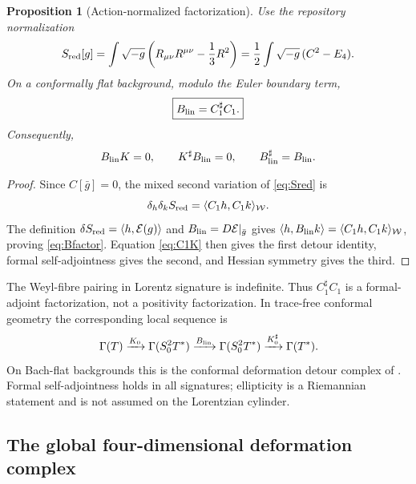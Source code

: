 \documentclass[11pt]{article}
\newtheorem{proposition}[theorem]{Proposition}
\theoremstyle{definition}
\theoremstyle{remark}
\newcommand{\W}{\mathcal W}
\newcommand{\cE}{\mathcal E}
\begin{document}
\begin{proposition}[Action-normalized factorization]\label{prop:factorization}
Use the repository normalization
\begin{equation}\label{eq:Sred}
 S_{\rm red}[g]=\int\sqrt{-g}
 \left(R_{\mu\nu}R^{\mu\nu}-\frac13R^2\right)
 =\frac12\int\sqrt{-g}\,(C^2-E_4).
\end{equation}
On a conformally flat background, modulo the Euler boundary term,
\begin{equation}\label{eq:Bfactor}
 \boxed{B_{\rm lin}=C_1^\sharp C_1.}
\end{equation}
Consequently,
\begin{equation}\label{eq:detour-identities}
 B_{\rm lin}K=0,
 \qquad
 K^\sharp B_{\rm lin}=0,
 \qquad
 B_{\rm lin}^\sharp=B_{\rm lin}.
\end{equation}
\end{proposition}

\begin{proof}
Since $C[\bar g]=0$, the mixed second variation of \eqref{eq:Sred} is
\begin{equation}
 \delta_h\delta_k S_{\rm red}
 =\langle C_1h,C_1k\rangle_{\W}.
\end{equation}
The definition
$\delta S_{\rm red}=\langle h,\cE(g)\rangle$ and
$B_{\rm lin}=D\cE|_{\bar g}$ gives
$\langle h,B_{\rm lin}k\rangle
=\langle C_1h,C_1k\rangle_{\W}$, proving
\eqref{eq:Bfactor}.  Equation \eqref{eq:C1K} then gives the first detour
identity, formal self-adjointness gives the second, and Hessian symmetry gives
the third.
\end{proof}

The Weyl-fibre pairing in Lorentz signature is indefinite.  Thus
$C_1^\sharp C_1$ is a formal-adjoint factorization, not a positivity
factorization.  In trace-free conformal geometry the corresponding local
sequence is
\begin{equation}\label{eq:detour-sequence}
 \Gamma(T)
 \xrightarrow{K_0}
 \Gamma(S^2_0T^*)
 \xrightarrow{B_{\rm lin}}
 \Gamma(S^2_0T^*)
 \xrightarrow{K_0^\sharp}
 \Gamma(T^*).
\end{equation}
On Bach-flat backgrounds this is the conformal deformation detour complex
of \cite{BransonGover}.  Formal self-adjointness holds in all signatures;
ellipticity is a Riemannian statement and is not assumed on the Lorentzian
cylinder.

\subsection{The global four-dimensional deformation complex}
\end{document}
